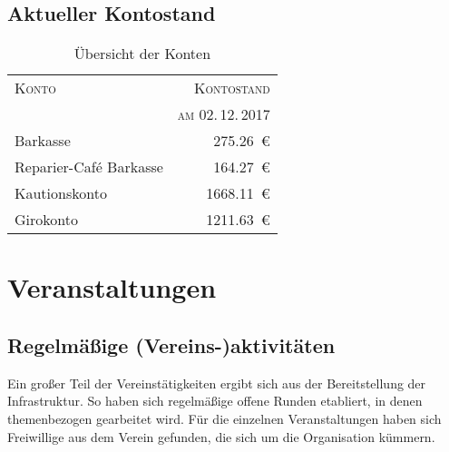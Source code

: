 \documentclass[ngerman]{scrartcl}
\begin{document}
\subsection{Aktueller Kontostand}

\begin{table}[h!]
        \centering{}
        \begin{tabular}{l|r}
        \toprule
        \textsc{Konto} & \textsc{Kontostand} \\
        & \textsc{am 02.\,12.\,2017} \\
        \midrule
        Barkasse & \num{275,26}~\euro{} \\
        Reparier-Café Barkasse & \num{164,27}~\euro{} \\
        Kautionskonto & \num{1668,11}~\euro{} \\ %
        Girokonto & \num{1211,63}~\euro{}\\
        \bottomrule
        \end{tabular}
\caption{Übersicht der Konten}
\end{table}

\section{Veranstaltungen}

\subsection{Regelmäßige (Vereins-)aktivitäten}

Ein großer Teil der Vereinstätigkeiten ergibt sich aus der
Bereitstellung der Infrastruktur. So haben sich regelmäßige offene Runden
etabliert, in denen themenbezogen gearbeitet wird. Für die
einzelnen Veranstaltungen haben sich Freiwillige aus dem Verein
gefunden, die sich um die Organisation kümmern.
\end{document}

